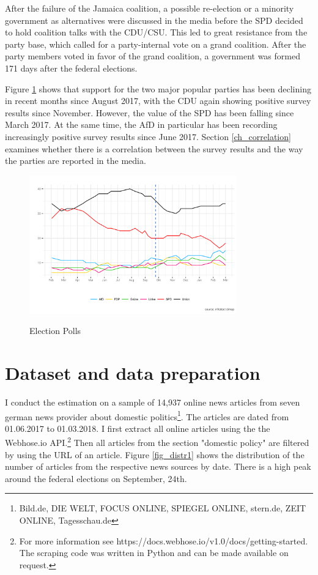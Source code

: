 \documentclass[12pt,a4paper,notitlepage]{article}
\begin{document}
After the failure of the Jamaica coalition, a possible re-election or a minority government as alternatives were discussed in the media before the SPD decided to hold coalition talks with the CDU/CSU. This led to great resistance from the party base, which called for a party-internal vote on a grand coalition. After the party members voted in favor of the grand coalition, a government was formed 171 days after the federal elections. 

Figure \ref{fig_polls} shows that support for the two major popular parties has been declining in recent months since August 2017, with the CDU again showing positive survey results since November. However, the value of the SPD has been falling since March 2017. At the same time, the AfD in particular has been recording increasingly positive survey results since June 2017. Section \ref{ch_correlation} examines whether there is a correlation between the survey results and the way the parties are reported in the media. 

\begin{figure}[H]
\begin{center}
	\caption{Election Polls}
	\includegraphics[width=0.8\textwidth]{../figs/polls.png}
	\label{fig_polls}
	\end{center}
\end{figure}

\section{Dataset and data preparation}\label{ch_data}

I conduct the estimation on a sample of 14,937 online news articles from seven german news provider about domestic politics\footnote{Bild.de, DIE WELT, FOCUS ONLINE, SPIEGEL ONLINE, stern.de, ZEIT ONLINE, Tagesschau.de}. The articles are dated from 01.06.2017 to 01.03.2018. I first extract all online articles using the the Webhose.io API.\footnote{For more information see https://docs.webhose.io/v1.0/docs/getting-started. The scraping code was written in Python and can be made available on request.} Then all articles from the section "domestic policy" are filtered by using the URL of an article. Figure \ref{fig_distr1} shows the distribution of the number of articles from the respective news sources by date. There is a high peak around the federal elections on September, 24th.  
\end{document}
